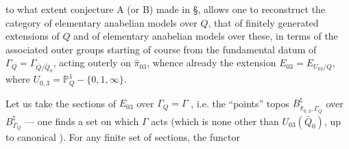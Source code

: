 to what extent conjecture A
(or B) made in  §, allows one to
reconstruct the category of elementary
anabelian models over $Q$,  that of finitely
generated extensions of $Q$ and of elementary
anabelian models over these, in
terms of the associated outer groups 
starting of course from the
fundamental datum of $\Gamma_Q=\Gamma_{\bar Q/\bar Q_0}$, acting
outerly on $\widehat\pi_{03}$, whence already
the extension $E_{03}=E_{U_{03}/Q}$, where
$U_{0,3}=\mathbb P^1_Q-\{0,1,\infty\}$.

Let us take the  sections of $E_{03}$ over $\Gamma_Q=\Gamma$
,
i.e. the ``points''   topos $B_{\widehat\pi_{0,3},\Gamma_Q}^{\natural}$ over
$B_{\Gamma_Q}^{\natural}$ — one finds a set on
which $\Gamma$ acts (which is none other than
$U_{03}(\bar Q_0)$, up to canonical ). For
any finite set  of sections,  the functor
